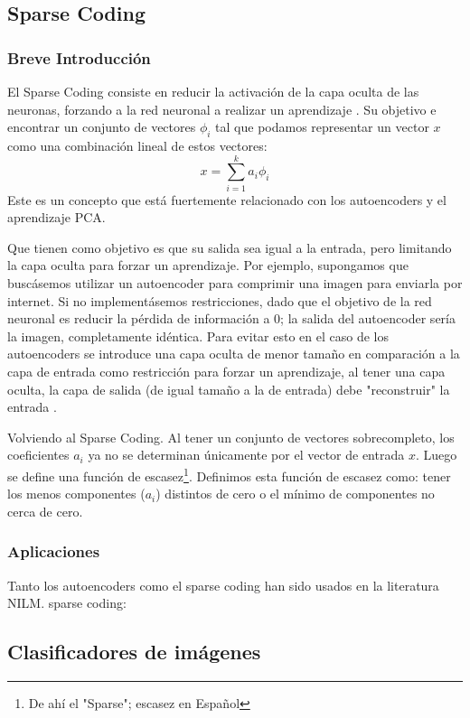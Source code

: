 \subsection{Sparse Coding}
\subsubsection{Breve Introducción}
El Sparse Coding consiste en reducir la activación de la capa oculta de las neuronas, forzando a la red neuronal a realizar un aprendizaje \autocite{stanfordSparse}.
Su objetivo e encontrar un conjunto de vectores $\phi_i$ tal que podamos representar un vector $x$ como una combinación lineal de estos vectores: 
$$
x = \sum_{i=1}^{k}a_i\phi_i
$$
Este es un concepto que está fuertemente relacionado con los autoencoders y el aprendizaje PCA. 

Que tienen como objetivo es que su salida sea igual a la entrada, pero limitando la capa oculta para forzar un aprendizaje. \autocite{stanfordAutoEncoding}
Por ejemplo, supongamos que buscásemos utilizar un autoencoder para comprimir una imagen para enviarla por internet. Si no implementásemos restricciones, dado que el objetivo de la red neuronal es reducir la pérdida de información a 0; la salida del autoencoder sería la imagen, completamente idéntica.
Para evitar esto en el caso de los autoencoders se introduce una capa oculta de menor tamaño en comparación a la capa de entrada como restricción para forzar un aprendizaje, al tener una capa oculta, la capa de salida (de igual tamaño a la de entrada) debe "reconstruir" la entrada \autocite{stanfordAutoEncoding} .

Volviendo al Sparse Coding. Al tener un conjunto de vectores sobrecompleto, los coeficientes $a_i$ ya no se determinan únicamente por el vector de entrada $x$. Luego se define una función de escasez\footnote{De ahí el "Sparse"; escasez en Español}. Definimos esta función de escasez como: tener los menos componentes ($a_i$) distintos de cero o el mínimo de componentes no cerca de cero.

\subsubsection{Aplicaciones}
Tanto los autoencoders como el sparse coding han sido usados en la literatura NILM.
sparse coding:\autocite{SparseCodingNILM}

\subsection{Clasificadores de imágenes}
